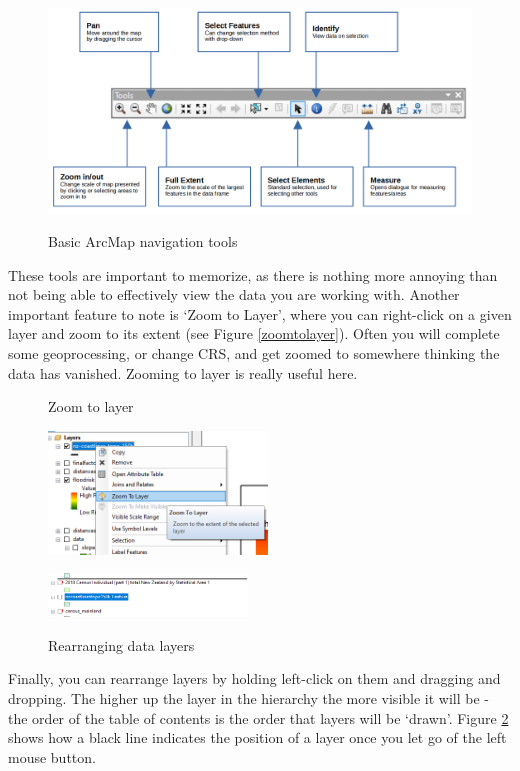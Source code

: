 \documentclass{article}
\begin{document}
\begin{figure}[h]
  \centering
  \caption{Basic ArcMap navigation tools}
  \includegraphics[width=450px]{images/toolbar.PNG}
  \label{toolbar}
\end{figure}

These tools are important to memorize, as there is nothing more annoying than not being able to effectively view the data you are working with. Another important feature to note is `Zoom to Layer', where you can right-click on a given layer and zoom to its extent (see Figure \ref{zoomtolayer}). Often you will complete some geoprocessing, or change CRS, and get zoomed to somewhere thinking the data has vanished. Zooming to layer is really useful here.

\begin{figure}[h]
  \centering
  \begin{minipage}[b]{0.5\textwidth}
    \centering
    \caption{Zoom to layer}
    \includegraphics[width=220px]{images/zoomtolayer.PNG}
    \label{zoomtolayer}
  \end{minipage}
  \hfill
  \begin{minipage}[b]{0.4\textwidth}
    \centering
    \caption{Rearranging data layers}
    \includegraphics[width=200px]{images/rearranginglayer.PNG}
    \label{rearranging}
  \end{minipage}
\end{figure}

Finally, you can rearrange layers by holding left-click on them and dragging and dropping. The higher up the layer in the hierarchy the more visible it will be - the order of the table of contents is the order that layers will be `drawn'. Figure \ref{rearranging} shows how a black line indicates the position of a layer once you let go of the left mouse button.
\pagebreak
\end{document}
